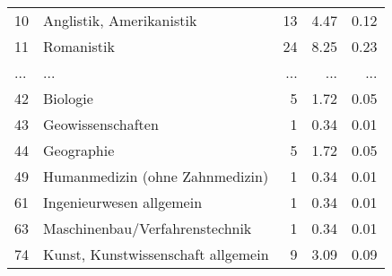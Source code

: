 \begin{longtable}{lXrrr}
        10 & \multicolumn{1}{X}{Anglistik, Amerikanistik} & %
          \num{13} &
          \num[round-mode=places,round-precision=2]{4.47} &
          \num[round-mode=places,round-precision=2]{0.12} \\
        11 & \multicolumn{1}{X}{Romanistik} & %
          \num{24} &
          \num[round-mode=places,round-precision=2]{8.25} &
          \num[round-mode=places,round-precision=2]{0.23} \\
       ... & ... & ... & ... & ... \\
        42 & \multicolumn{1}{X}{Biologie} & %
          \num{5} &
          \num[round-mode=places,round-precision=2]{1.72} &
          \num[round-mode=places,round-precision=2]{0.05} \\

        43 & \multicolumn{1}{X}{Geowissenschaften} & %
          \num{1} &
          \num[round-mode=places,round-precision=2]{0.34} &
          \num[round-mode=places,round-precision=2]{0.01} \\

        44 & \multicolumn{1}{X}{Geographie} & %
          \num{5} &
          \num[round-mode=places,round-precision=2]{1.72} &
          \num[round-mode=places,round-precision=2]{0.05} \\

        49 & \multicolumn{1}{X}{Humanmedizin (ohne Zahnmedizin)} & %
          \num{1} &
          \num[round-mode=places,round-precision=2]{0.34} &
          \num[round-mode=places,round-precision=2]{0.01} \\

        61 & \multicolumn{1}{X}{Ingenieurwesen allgemein} & %
          \num{1} &
          \num[round-mode=places,round-precision=2]{0.34} &
          \num[round-mode=places,round-precision=2]{0.01} \\

        63 & \multicolumn{1}{X}{Maschinenbau/Verfahrenstechnik} & %
          \num{1} &
          \num[round-mode=places,round-precision=2]{0.34} &
          \num[round-mode=places,round-precision=2]{0.01} \\

        74 & \multicolumn{1}{X}{Kunst, Kunstwissenschaft allgemein} & %
          \num{9} &
          \num[round-mode=places,round-precision=2]{3.09} &
          \num[round-mode=places,round-precision=2]{0.09} \\


\end{longtable}
